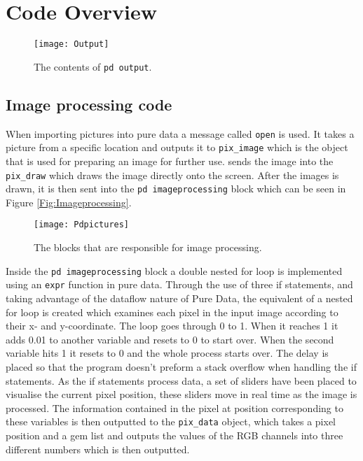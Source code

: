 \chapter{Code Overview}\label{ch:codeoverview}


\begin{figure}
\centering
\texttt{[image: Output]}
\caption{The contents of \texttt{pd output}.}
\label{Fig:Output}
\end{figure}

\section{Image processing code}
When importing pictures into pure data a message called \texttt{open} is used. It takes a picture from a specific location and outputs it to \texttt{pix\_image} which is the object that is used for preparing an image for further use.  sends the image into the \texttt{pix\_draw} which draws the image directly onto the screen. After the images is drawn, it is then sent into the \texttt{pd imageprocessing} block which can be seen in Figure \ref{Fig:Imageprocessing}.

\begin{figure}
\centering
\texttt{[image: Pdpictures]}
\caption{The blocks that are responsible for image processing.}
\label{Fig:pdpicture}
\end{figure}

Inside the \texttt{pd imageprocessing} block a double nested for loop is implemented using an \texttt{expr} function in pure data. Through the use of three if statements, and taking advantage of the dataflow nature of Pure Data, the equivalent of a nested for loop is created which examines each pixel in the input image according to their x- and y-coordinate. The loop goes through 0 to 1. When it reaches 1 it adds 0.01 to another variable and resets to 0 to start over. When the second variable hits 1 it resets to 0 and the whole process starts over. The delay is placed so that the program doesn't preform a stack overflow when handling the if statements. 
As the if statements process data, a set of sliders have been placed to visualise the current pixel position, these sliders move in real time as the image is processed. The information contained in the pixel at position corresponding to these variables is then outputted to the \texttt{pix\_data} object, which takes a pixel position and a gem list and outputs the values of the RGB channels into three different numbers which is then outputted. 

